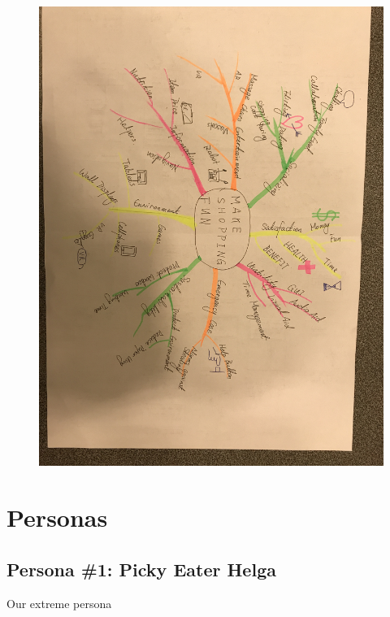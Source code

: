 \documentclass[a4paper,10pt,oneside]{scrreprt}
\begin{document}
			\begin{figure}[H]
				\centering
				\includegraphics[width=14cm]{images/conceptmap.jpg}
			\end{figure}


	\clearpage
	\section{Personas}

		\subsection{Persona \#1: Picky Eater Helga}

		Our extreme persona
\end{document}
